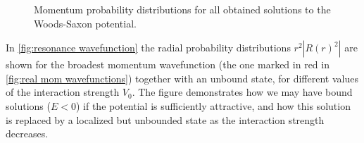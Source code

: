 \documentclass[../main/report.tex]{subfiles}
\begin{document}

\begin{figure}[H]
	    \wfs
\caption{Momentum probability distributions for all obtained solutions to the Woods-Saxon potential.} 
\label{fig:he5_eigvecs}
\end{figure}


In \cref{fig:resonance wavefunction} the radial probability distributions $r^2|R(r)^2|$ are shown for the broadest momentum wavefunction (the one marked in red in \cref{fig:real mom wavefunctions}) together with an unbound state, for different values of the interaction strength $V_0$. The figure demonstrates how we may have bound solutions ($E<0$) if the potential is sufficiently attractive, and how this solution is replaced by a localized but unbounded state as the interaction strength decreases. 

\end{document}
